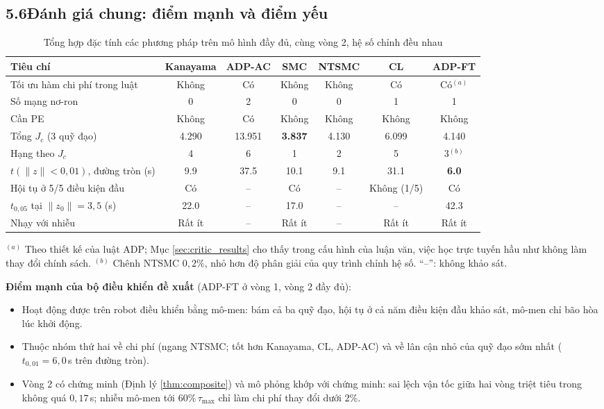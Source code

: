 \documentclass[12pt,a4paper]{article}
\begin{document}
\subsection*{5.6\quad Đánh giá chung: điểm mạnh và điểm yếu}

\begin{table}[H]
\centering
\caption{Tổng hợp đặc tính các phương pháp trên mô hình đầy đủ, cùng vòng 2, hệ số chỉnh đều nhau}
\label{tab:summary_all}
\footnotesize
\setlength{\tabcolsep}{4pt}
\begin{tabular}{>{\raggedright\arraybackslash}p{3.4cm}cccccc}
\toprule
\textbf{Tiêu chí} & \textbf{Kanayama} & \textbf{ADP-AC} & \textbf{SMC} & \textbf{NTSMC} & \textbf{CL} & \textbf{ADP-FT} \\
\midrule
Tối ưu hàm chi phí trong luật & Không & Có & Không & Không & Có & Có$^{(a)}$ \\
Số mạng nơ-ron & 0 & 2 & 0 & 0 & 1 & 1 \\
Cần PE & Không & Có & Không & Không & Không & Không \\
Tổng $J_c$ (3 quỹ đạo) & 4.290 & 13.951 & \textbf{3.837} & 4.130 & 6.099 & 4.140 \\
Hạng theo $J_c$ & 4 & 6 & 1 & 2 & 5 & 3$^{(b)}$ \\
$t(\|z\| < 0{,}01)$, đường tròn (s) & 9.9 & 37.5 & 10.1 & 9.1 & 31.1 & \textbf{6.0} \\
Hội tụ ở 5/5 điều kiện đầu & Có & -- & Có & -- & Không (1/5) & Có \\
$t_{0,05}$ tại $\|z_0\| = 3{,}5$ (s) & 22.0 & -- & 17.0 & -- & -- & 42.3 \\
Nhạy với nhiễu & Rất ít & -- & Rất ít & -- & Rất ít & Rất ít \\
\bottomrule
\end{tabular}

\vspace{0.15cm}
{\footnotesize\raggedright $^{(a)}$ Theo thiết kế của luật ADP; Mục \ref{sec:critic_results} cho thấy trong cấu hình của luận văn, việc học trực tuyến hầu như không làm thay đổi chính sách. $^{(b)}$ Chênh NTSMC $0{,}2\%$, nhỏ hơn độ phân giải của quy trình chỉnh hệ số. ``--'': không khảo sát.}
\end{table}

\textbf{Điểm mạnh của bộ điều khiển đề xuất} (ADP-FT ở vòng 1, vòng 2 đầy đủ):
\begin{itemize}
    \item Hoạt động được trên robot điều khiển bằng mô-men: bám cả ba quỹ đạo, hội tụ ở cả năm điều kiện đầu khảo sát, mô-men chỉ bão hòa lúc khởi động.
    \item Thuộc nhóm thứ hai về chi phí (ngang NTSMC; tốt hơn Kanayama, CL, ADP-AC) và về lân cận nhỏ của quỹ đạo sớm nhất ($t_{0,01} = 6{,}0$\,s trên đường tròn).
    \item Vòng 2 có chứng minh (Định lý \ref{thm:composite}) và mô phỏng khớp với chứng minh: sai lệch vận tốc giữa hai vòng triệt tiêu trong không quá $0{,}17$\,s; nhiễu mô-men tới $60\%\,\tau_\text{max}$ chỉ làm chi phí thay đổi dưới $2\%$.
\end{itemize}
\end{document}
